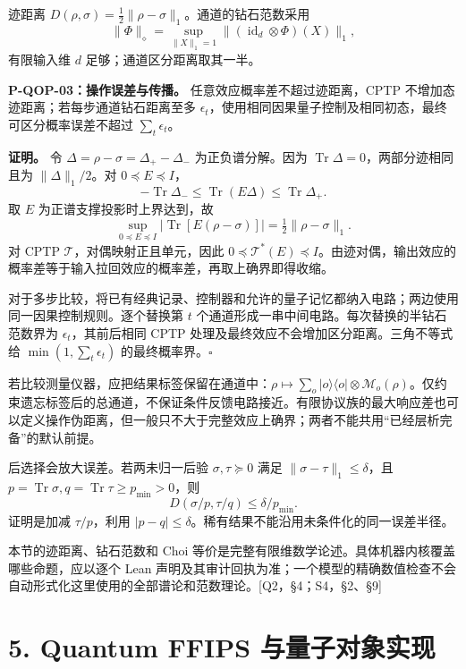 \documentclass[
  11pt,
  oneside]{book}
\begin{document}
迹距离 \(D(\rho,\sigma)=\frac12\|\rho-\sigma\|_1\)。通道的钻石范数采用
\[
\|\Phi\|_\diamond=\sup_{\|X\|_1=1}
\|(\operatorname{id}_d\otimes\Phi)(X)\|_1,
\] 有限输入维 \(d\) 足够；通道区分距离取其一半。

\protect\hypertarget{p-qop-03}{}{}

\textbf{P-QOP-03：操作误差与传播。} 任意效应概率差不超过迹距离，CPTP
不增加态迹距离；若每步通道钻石距离至多
\(\epsilon_t\)，使用相同因果量子控制及相同初态，最终可区分概率误差不超过
\(\sum_t\epsilon_t\)。

\textbf{证明。} 令 \(\Delta=\rho-\sigma=\Delta_+-\Delta_-\)
为正负谱分解。因为 \(\operatorname{Tr}\Delta=0\)，两部分迹相同且为
\(\|\Delta\|_1/2\)。对 \(0\preceq E\preceq I\)， \[
-\operatorname{Tr}\Delta_-\le\operatorname{Tr}(E\Delta)
\le\operatorname{Tr}\Delta_+.
\] 取 \(E\) 为正谱支撑投影时上界达到，故 \[
\sup_{0\preceq E\preceq I}|\operatorname{Tr}[E(\rho-\sigma)]|
=\tfrac12\|\rho-\sigma\|_1.
\] 对 CPTP \(\mathcal T\)，对偶映射正且单元，因此
\(0\preceq\mathcal T^*(E)\preceq I\)。由迹对偶，输出效应的概率差等于输入拉回效应的概率差，再取上确界即得收缩。

对于多步比较，将已有经典记录、控制器和允许的量子记忆都纳入电路；两边使用同一因果控制规则。逐个替换第
\(t\) 个通道形成一串中间电路。每次替换的半钻石范数界为
\(\epsilon_t\)，其前后相同 CPTP
处理及最终效应不会增加区分距离。三角不等式给
\(\min(1,\sum_t\epsilon_t)\) 的最终概率界。\(\square\)

若比较测量仪器，应把结果标签保留在通道中：\(\rho\mapsto\sum_o|o\rangle\langle o|\otimes\mathcal M_o(\rho)\)。仅约束遗忘标签后的总通道，不保证条件反馈电路接近。有限协议族的最大响应差也可以定义操作伪距离，但一般只不大于完整效应上确界；两者不能共用``已经层析完备''的默认前提。

后选择会放大误差。若两未归一后验 \(\sigma,\tau\succeq0\) 满足
\(\|\sigma-\tau\|_1\le\delta\)，且
\(p=\operatorname{Tr}\sigma,q=\operatorname{Tr}\tau\ge p_{\min}>0\)，则
\[
D(\sigma/p,\tau/q)\le\delta/p_{\min}.
\] 证明是加减 \(\tau/p\)，利用
\(|p-q|\le\delta\)。稀有结果不能沿用未条件化的同一误差半径。

本节的迹距离、钻石范数和 Choi
等价是完整有限维数学论述。具体机器内核覆盖哪些命题，应以逐个 Lean
声明及其审计回执为准；一个模型的精确数值检查不会自动形式化这里使用的全部谱论和范数理论。{[}Q2，§4；S4，§2、§9{]}

\hypertarget{ch-5}{%
\chapter{5. Quantum FFIPS 与量子对象实现}\label{ch-5}}
\end{document}

